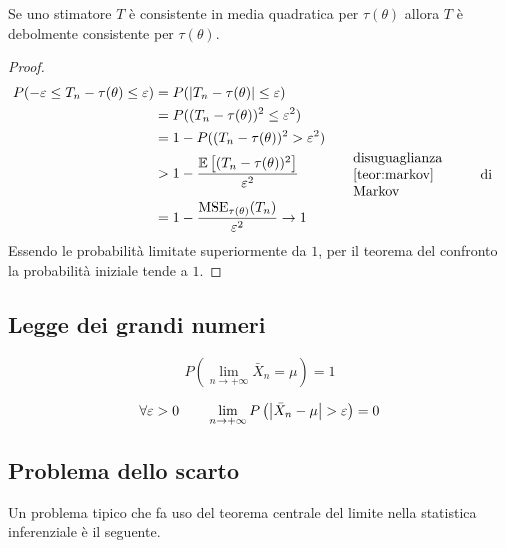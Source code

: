 \begin{teor}
	Se uno stimatore $T$ è consistente in media quadratica per $\tau(\theta)$ allora $T$ è debolmente consistente per $\tau(\theta)$.
\end{teor}
\begin{proof}
	\begin{align*}
		P(-\varepsilon\leq T_n-\tau(\theta)\leq \varepsilon) & = P(\abs{T_n-\tau(\theta)}\leq\varepsilon)                                                                         \\
		                                                     & = P((T_n-\tau(\theta))^2\leq\varepsilon^2)                                                                         \\
		                                                     & = 1 - P((T_n-\tau(\theta))^2>\varepsilon^2)                                                                        \\
		                                                     & > 1-\frac{\ev{(T_n-\tau(\theta))^2}}{\varepsilon^2} \bc{\parbox{35mm}{disuguaglianza \ref{teor:markov} di Markov}} \\
		                                                     & = 1-\frac{\MSE_{\tau(\theta)}(T_n)}{\varepsilon^2} \to 1
	\end{align*}
	Essendo le probabilità limitate superiormente da $1$, per il teorema del confronto la probabilità iniziale tende a $1$.
\end{proof}


\subsection{Legge dei grandi numeri}
\begin{teor}
	\begin{equation*}
		P\left(\lim_{n\to+\infty}\bar X_n = \mu\right) = 1
	\end{equation*}
\end{teor}

\begin{teor}
	\begin{equation*}
		\forall\varepsilon > 0 \qquad \lim_{n\to+\infty} P\left(\left\lvert \bar X_n - \mu \right\rvert > \varepsilon\right) = 0
	\end{equation*}
\end{teor}


\subsection{Problema dello scarto}
Un problema tipico che fa uso del teorema centrale del limite nella statistica inferenziale è il seguente.

